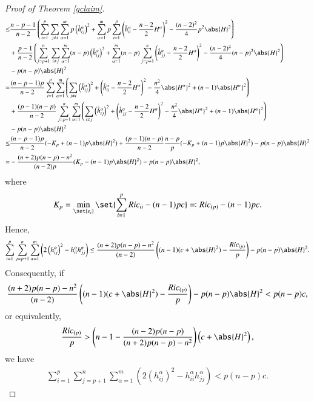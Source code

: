 \documentclass[12pt]{amsart}
\theoremstyle{plain}
\theoremstyle{remark}
\theoremstyle{definition}
\numberwithin{equation}{section}
\begin{document}
\begin{proof}[Proof of Theorem \ref{gclaim}]
\begin{align*}
\leq&\dfrac{n-p-1}{n-2}\left(\sum_{i=1}^p\sum_{j\neq i}\sum_{\alpha=1}^mp\left(\mathring{h}_{ij}^{\alpha}\right)^2+\sum_{\alpha=1}^mp\sum_{i=1}^p\left(\mathring{h}^{\alpha}_{ii}-\dfrac{n-2}{2}H^{\alpha}\right)^2-\dfrac{(n-2)^2}{4}p^2\abs{H}^2\right)\\
&+\dfrac{p-1}{n-2}\left(\sum_{j=p+1}^n\sum_{i\neq j}\sum_{\alpha=1}^m(n-p)\left(\mathring{h}_{ij}^{\alpha}\right)^2+\sum_{\alpha=1}^m(n-p)\sum_{j=p+1}^n\left(\mathring{h}^{\alpha}_{jj}-\dfrac{n-2}{2}H^{\alpha}\right)^2-\dfrac{(n-2)^2}{4}(n-p)^2\abs{H}^2\right)\\
&-p(n-p)\abs{H}^2\\
=&\dfrac{(n-p-1)p}{n-2}\sum_{i=1}^p\sum_{\alpha=1}^m\left(\sum_{j\neq i}\left(\mathring{h}_{ij}^{\alpha}\right)^2+\left(\mathring{h}^{\alpha}_{ii}-\dfrac{n-2}{2}H^{\alpha}\right)^2-\dfrac{n^2}{4}\abs{H^{\alpha}}^2+(n-1)\abs{H^{\alpha}}^2\right)\\
&+\dfrac{(p-1)(n-p)}{n-2}\sum_{j=p+1}^n\sum_{\alpha=1}^m\left(\sum_{i\neq j}\left(\mathring{h}_{ij}^{\alpha}\right)^2+\left(\mathring{h}^{\alpha}_{jj}-\dfrac{n-2}{2}H^{\alpha}\right)^2-\dfrac{n^2}{4}\abs{H^{\alpha}}^2+(n-1)\abs{H^{\alpha}}^2\right)\\
&-p(n-p)\abs{H}^2\\
\leq&\dfrac{(n-p-1)p}{n-2}(-K_p+(n-1)p\abs{H}^2)+\dfrac{(p-1)(n-p)}{n-2}\dfrac{n-p}{p}(-K_p+(n-1)p\abs{H}^2)-p(n-p)\abs{H}^2\\
=&-\dfrac{(n+2)p(n-p)-n^2}{(n-2)p}(K_p-(n-1)p\abs{H}^2)-p(n-p)\abs{H}^2,
\end{align*}
where
\begin{align*}
K_p=\min_{\set{e_i}}\set{\sum_{i=1}^pRic_{ii}-(n-1)pc}\eqqcolon Ric_{(p)}-(n-1)pc.
\end{align*}
Hence,
\begin{align*}
\sum_{i=1}^p\sum_{j=p+1}^n\sum_{\alpha=1}^m\left(2\left(h_{ij}^{\alpha}\right)^2-h_{ii}^{\alpha}h_{jj}^{\alpha}\right)\leq\dfrac{(n+2)p(n-p)-n^2}{(n-2)}\left((n-1)(c+\abs{H}^2)-\dfrac{Ric_{(p)}}{p}\right)-p(n-p)\abs{H}^2.
\end{align*}
Consequently, if
\begin{align*}
\dfrac{(n+2)p(n-p)-n^2}{(n-2)}\left((n-1)(c+\abs{H}^2)-\dfrac{Ric_{(p)}}{p}\right)-p(n-p)\abs{H}^2<p(n-p)c,
\end{align*}
or equivalently,
\begin{align*}
\dfrac{Ric_{(p)}}{p}>\left(n-1-\dfrac{(n-2)p(n-p)}{(n+2)p(n-p)-n^2}\right)\left(c+\abs{H}^2\right),
\end{align*}
we have
\begin{align*}
\sum_{i=1}^p\sum_{j=p+1}^n\sum_{\alpha=1}^m\left(2\left(h_{ij}^{\alpha}\right)^2-h_{ii}^{\alpha}h_{jj}^{\alpha}\right)<p(n-p)c.
\end{align*}


\end{proof}
\end{document}
